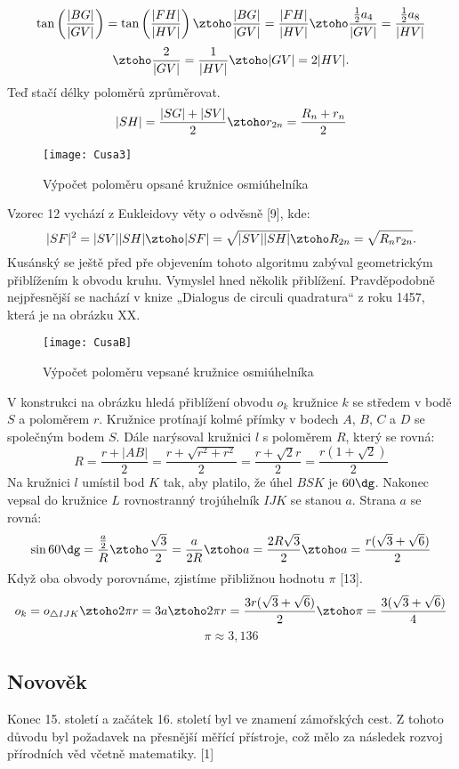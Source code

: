 \documentclass[rocnikovka]{gzwroc} %
\begin{document}
$$
\tan\left(\frac{|BG|}{|GV|}\right)=\tan\left(\frac{|FH|}{|HV|}\right) \ztoho \frac{|BG|}{|GV|}=\frac{|FH|}{|HV|} \ztoho \frac{\frac{1}{2}a_4}{|GV|}=\frac{\frac{1}{2}a_8}{|HV|}
$$
$$
\ztoho \frac{2}{|GV|}=\frac{1}{|HV|} \ztoho |GV|=2|HV|.
$$
Teď stačí délky poloměrů zprůměrovat.
$$
|SH|=\frac{|SG|+|SV|}{2} \ztoho r_{2n}=\frac{R_n+r_n}{2}
$$
\begin{figure}[!ht]
\texttt{[image: Cusa3]}
\caption{Výpočet poloměru opsané kružnice osmiúhelníka}
\label{fig:kruh}
\end{figure}
Vzorec 12 vychází z Eukleidovy věty o odvěsně [9], kde:
$$
|SF|^2=|SV||SH| \ztoho |SF|=\sqrt{|SV||SH|} \ztoho R_{2n}=\sqrt{R_nr_{2n}}.
$$
Kusánský se ještě před pře objevením tohoto algoritmu zabýval geometrickým  přiblížením k obvodu kruhu. Vymyslel hned několik přiblížení. Pravděpodobně nejpřesnější se nachází v knize „Dialogus de circuli quadratura“ z roku 1457, která je na obrázku XX.
\begin{figure}[!ht]
\texttt{[image: CusaB]}
\caption{Výpočet poloměru vepsané kružnice osmiúhelníka}
\label{fig:kruh}
\end{figure}
V konstrukci na obrázku hledá přiblížení obvodu $o_k$ kružnice $k$ se středem v bodě $S$ a poloměrem $r$. Kružnice protínají kolmé přímky v bodech $A$, $B$, $C$ a $D$ se společným bodem $S$. Dále narýsoval kružnici $l$ s poloměrem $R$, který se rovná:
$$
R=\frac{r+|AB|}{2}=\frac{r+\sqrt{r^2+r^2}}{2}=\frac{r+\sqrt{2}r}{2}=\frac{r(1+\sqrt{2})}{2}
$$
Na kružnici $l$ umístil bod $K$ tak, aby platilo, že úhel $BSK$ je $60\dg$. Nakonec vepsal do kružnice $L$ rovnostranný trojúhelník $IJK$ se stanou $a$. Strana $a$ se rovná:
$$
\sin 60\dg =\frac{\frac{a}{2}}{R} \ztoho \frac{\sqrt{3}}{2}= \frac{a}{2R} \ztoho a= \frac{2R\sqrt{3}}{2} \ztoho a= \frac{r(\sqrt{3}+\sqrt{6})}{2}
$$
Když oba obvody porovnáme, zjistíme přibližnou hodnotu $\pi$ [13].
$$
o_k=o_{\triangle IJK} \ztoho 2\pi r=3a \ztoho 2\pi r= \frac{3r(\sqrt{3}+\sqrt{6})}{2} \ztoho \pi= \frac{3(\sqrt{3}+\sqrt{6})}{4}
$$
$$
\pi \approx 3,136
$$
\subsection{Novověk}
Konec 15. století a začátek 16. století byl ve znamení zámořských cest. Z tohoto důvodu byl požadavek na přesnější měřící přístroje, což mělo za následek rozvoj přírodních věd včetně matematiky. [1]
\end{document}
